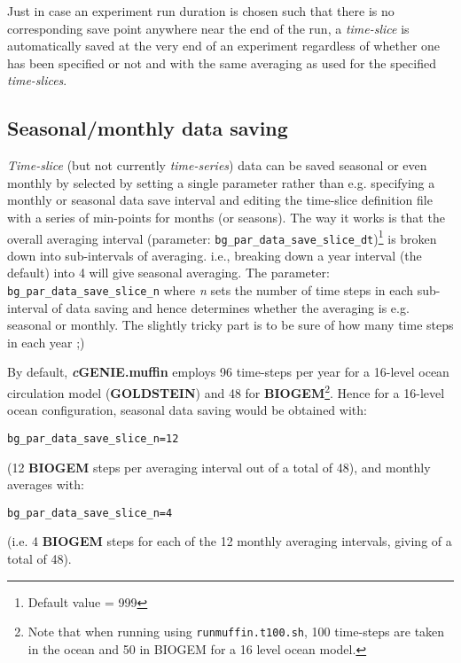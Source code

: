 \documentclass[11pt,fleqn]{book} %
\begin{document}
Just in case an experiment run duration is chosen such that there is no corresponding save point anywhere near the end of the run, a \textit{time-slice} is automatically saved at the very end of an experiment regardless of whether one has been specified or not and with the same averaging as used for the specified \textit{time-slices}.

%
\subsection{Seasonal/monthly data saving}

\textit{Time-slice} (but not currently \textit{time-series}) data can be saved seasonal or even monthly by selected by setting a single parameter rather than e.g. specifying a monthly or seasonal data save interval and editing the time-slice definition file with a series of min-points for months (or seasons).
The way it works is that the overall averaging interval (parameter: \texttt{bg\_par\_data\_save\_slice\_dt})\footnote{Default value = 999} is broken down into sub-intervals of averaging. i.e., breaking down a year interval (the default) into 4 will give seasonal averaging. The parameter: \texttt{bg\_par\_data\_save\_slice\_n} where \textit{n} sets the number of time steps in each sub-interval of data saving and hence determines whether the averaging is e.g. seasonal or monthly. The slightly tricky part is to be sure of how many time steps in each year ;)

By default, \textbf{\textit{c}GENIE.muffin} employs 96 time-steps per year for a 16-level ocean circulation model (\textbf{GOLDSTEIN}) and 48 for \textbf{BIOGEM}\footnote{Note that when running using \texttt{runmuffin.t100.sh}, 100 time-steps are taken in the ocean and 50 in BIOGEM for a 16 level ocean model.}. Hence for a 16-level ocean configuration, seasonal data saving would be obtained with:
\begin{verbatim}bg_par_data_save_slice_n=12\end{verbatim}
(12 \textbf{BIOGEM} steps per averaging interval out of a total of 48), and monthly averages with:
\begin{verbatim}bg_par_data_save_slice_n=4\end{verbatim}
(i.e. 4 \textbf{BIOGEM} steps for each of the 12 monthly averaging intervals, giving of a total of 48).
\end{document}
